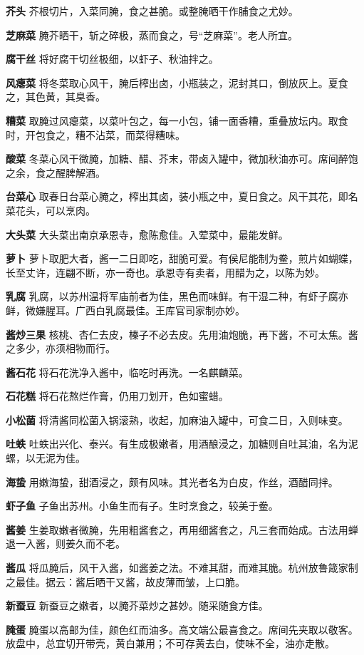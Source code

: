 \documentclass[]{article}
\begin{document}
\textbf{芥头} 芥根切片，入菜同腌，食之甚脆。或整腌晒干作脯食之尤妙。

\textbf{芝麻菜} 腌芥晒干，斩之碎极，蒸而食之，号``芝麻菜''。老人所宜。

\textbf{腐干丝} 将好腐干切丝极细，以虾子、秋油拌之。

\textbf{风瘪菜}
将冬菜取心风干，腌后榨出卤，小瓶装之，泥封其口，倒放灰上。夏食之，其色黄，其臭香。

\textbf{糟菜}
取腌过风瘪菜，以菜叶包之，每一小包，铺一面香糟，重叠放坛内。取食时，开包食之，糟不沾菜，而菜得糟味。

\textbf{酸菜}
冬菜心风干微腌，加糖、醋、芥末，带卤入罐中，微加秋油亦可。席间醉饱之余，食之醒脾解酒。

\textbf{台菜心}
取春日台菜心腌之，榨出其卤，装小瓶之中，夏日食之。风干其花，即名菜花头，可以烹肉。

\textbf{大头菜} 大头菜出南京承恩寺，愈陈愈佳。入荤菜中，最能发鲜。

\textbf{萝卜}
萝卜取肥大者，酱一二日即吃，甜脆可爱。有侯尼能制为鲞，煎片如蝴蝶，长至丈许，连翩不断，亦一奇也。承恩寺有卖者，用醋为之，以陈为妙。

\textbf{乳腐}
乳腐，以苏州温将军庙前者为佳，黑色而味鲜。有干湿二种，有虾子腐亦鲜，微嫌腥耳。广西白乳腐最佳。王库官司家制亦妙。

\textbf{酱炒三果}
核桃、杏仁去皮，榛子不必去皮。先用油炮脆，再下酱，不可太焦。酱之多少，亦须相物而行。

\textbf{酱石花} 将石花洗净入酱中，临吃时再洗。一名麒麟菜。

\textbf{石花糕} 将石花熬烂作膏，仍用刀划开，色如蜜蜡。

\textbf{小松菌}
将清酱同松菌入锅滚熟，收起，加麻油入罐中，可食二日，入则味变。

\textbf{吐蛈}
吐蛈出兴化、泰兴。有生成极嫩者，用酒酿浸之，加糖则自吐其油，名为泥螺，以无泥为佳。

\textbf{海蛰}
用嫩海蛰，甜酒浸之，颇有风味。其光者名为白皮，作丝，酒醋同拌。

\textbf{虾子鱼} 子鱼出苏州。小鱼生而有子。生时烹食之，较美于鲞。

\textbf{酱姜}
生姜取嫩者微腌，先用粗酱套之，再用细酱套之，凡三套而始成。古法用蝉退一入酱，则姜久而不老。

\textbf{酱瓜}
将瓜腌后，风干入酱，如酱姜之法。不难其甜，而难其脆。杭州放鲁箴家制之最佳。据云：酱后晒干又酱，故皮薄而皱，上口脆。

\textbf{新蚕豆} 新蚕豆之嫩者，以腌芥菜炒之甚妙。随采随食方佳。

\textbf{腌蛋}
腌蛋以高邮为佳，颜色红而油多。高文端公最喜食之。席间先夹取以敬客。放盘中，总宜切开带壳，黄白兼用；不可存黄去白，使味不全，油亦走散。
\end{document}
